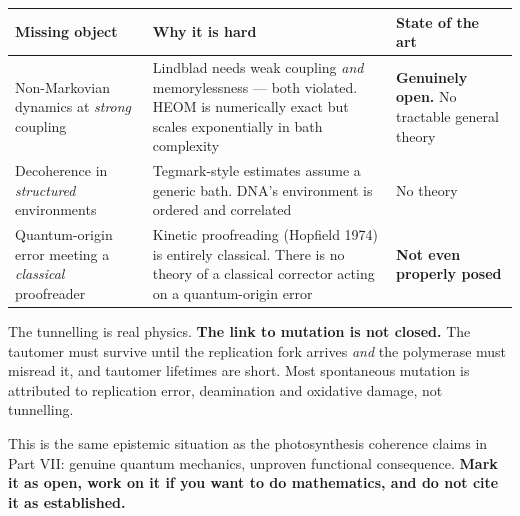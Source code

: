 \begin{tier3}[title={What mathematics is actually missing here}]
\begin{center}\small
\begin{tabular}{@{}>{\raggedright\arraybackslash}p{4.85cm}>{\raggedright\arraybackslash}p{5.85cm}>{\raggedright\arraybackslash}p{4.85cm}@{}}
\toprule
\rowcolor{alert!12}
\textbf{\color{alert}Missing object} & \textbf{\color{alert}Why it is hard} & \textbf{\color{alert}State of the art}\\
\midrule
Non-Markovian dynamics at \emph{strong} coupling &
 Lindblad needs weak coupling \emph{and} memorylessness --- both violated. HEOM is numerically exact
 but scales exponentially in bath complexity &
 \textbf{Genuinely open.} No tractable general theory\\
Decoherence in \emph{structured} environments &
 Tegmark-style estimates assume a generic bath. DNA's environment is ordered and correlated &
 No theory\\
\rowcolor{alert!6}
Quantum-origin error meeting a \emph{classical} proofreader &
 Kinetic proofreading (Hopfield 1974) is entirely classical. There is no theory of a classical
 corrector acting on a quantum-origin error &
 \textbf{Not even properly posed}\\
\bottomrule
\end{tabular}
\end{center}
\end{tier3}

\begin{critbox}[title={Be careful here --- and tell your students the same}]
The tunnelling is real physics. \textbf{The link to mutation is not closed.} The tautomer must
survive until the replication fork arrives \emph{and} the polymerase must misread it, and tautomer
lifetimes are short. Most spontaneous mutation is attributed to replication error, deamination and
oxidative damage, not tunnelling.

This is the same epistemic situation as the photosynthesis coherence claims in Part VII: genuine
quantum mechanics, unproven functional consequence. \textbf{Mark it as open, work on it if you want
to do mathematics, and do not cite it as established.}
\end{critbox}
